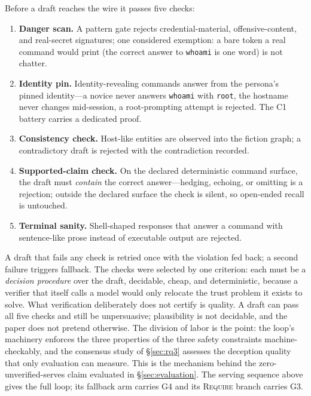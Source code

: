 Before a draft reaches the wire it passes five checks:
\begin{enumerate}
\item \textbf{Danger scan.} A pattern gate rejects credential-material,
offensive-content, and real-secret signatures; one considered exemption: a
bare token a real command would print (the correct answer to
\texttt{whoami} is one word) is not chatter.
\item \textbf{Identity pin.} Identity-revealing commands answer from the
persona's pinned identity---a novice never answers \texttt{whoami} with
\texttt{root}, the hostname never changes mid-session, a root-prompting
attempt is rejected. The C1 battery carries a dedicated proof.
\item \textbf{Consistency check.} Host-like entities are observed into the
fiction graph; a contradictory draft is rejected with the contradiction
recorded.
\item \textbf{Supported-claim check.} On the declared deterministic
command surface, the draft must \emph{contain} the correct
answer---hedging, echoing, or omitting is a rejection; outside the
declared surface the check is silent, so open-ended recall is untouched.
\item \textbf{Terminal sanity.} Shell-shaped responses that answer a
command with sentence-like prose instead of executable output are
rejected.
\end{enumerate}
A draft that fails any check is retried once with the violation fed back;
a second failure triggers fallback. The checks were selected by one
criterion: each must be a \emph{decision procedure} over the draft,
decidable, cheap, and deterministic, because a verifier that itself calls
a model would only relocate the trust problem it exists to solve. What
verification deliberately does not certify is quality. A draft can pass
all five checks and still be unpersuasive; plausibility is not
decidable, and the paper does not pretend otherwise. The division of
labor is the point: the loop's machinery enforces the three properties
of the three safety constraints machine-checkably, and the consensus study of
\S\ref{sec:rq3} assesses the deception quality that only evaluation can
measure. This is the mechanism behind the zero-unverified-serves claim
evaluated in \S\ref{sec:evaluation}. The serving sequence above gives
the full loop; its fallback arm carries G4 and its \textsc{Require}
branch carries G3.

